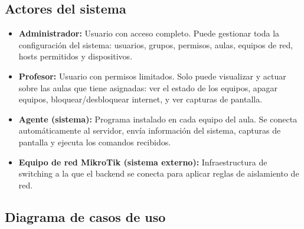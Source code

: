 \documentclass[12pt, a4paper, twoside]{article}
\begin{document}
\subsection{Actores del sistema}

\begin{itemize}
  \item \textbf{Administrador:} Usuario con acceso completo. Puede gestionar toda la configuración del sistema: usuarios, grupos, permisos, aulas, equipos de red, hosts permitidos y dispositivos.
  \item \textbf{Profesor:} Usuario con permisos limitados. Solo puede visualizar y actuar sobre las aulas que tiene asignadas: ver el estado de los equipos, apagar equipos, bloquear/desbloquear internet, y ver capturas de pantalla.
  \item \textbf{Agente (sistema):} Programa instalado en cada equipo del aula. Se conecta automáticamente al servidor, envía información del sistema, capturas de pantalla y ejecuta los comandos recibidos.
  \item \textbf{Equipo de red MikroTik (sistema externo):} Infraestructura de switching a la que el backend se conecta para aplicar reglas de aislamiento de red.
\end{itemize}

\subsection{Diagrama de casos de uso}
\end{document}
